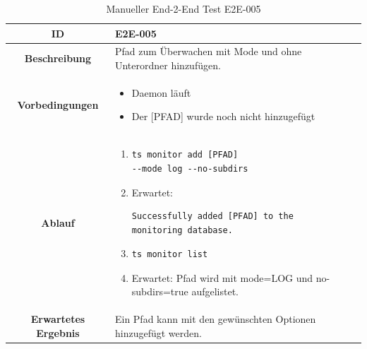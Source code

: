 \documentclass[a4paper,12pt]{report}
\begin{document}
    \clearpage

    \begin{table}[h!]
        \centering
        \setlength{\leftmargini}{0.8cm}
        \begin{tabular}{|c|p{10cm}|}
            \hline
            \textbf{ID}                  & E2E-005                                                        \\ \hline
            \textbf{Beschreibung}        & Pfad zum Überwachen mit Mode und ohne Unterordner hinzufügen.  \\ \hline
            \textbf{Vorbedingungen} &
            \begin{itemize}
                \item Daemon läuft
                \item  Der [PFAD] wurde noch nicht hinzugefügt
            \end{itemize} \\ \hline
            \textbf{Ablauf} &
            \begin{enumerate}
                \item \begin{verbatim}ts monitor add [PFAD]
--mode log --no-subdirs
                \end{verbatim}
                \item Erwartet: \begin{verbatim}Successfully added [PFAD] to the
monitoring database.
                \end{verbatim}
                \item \begin{verbatim}ts monitor list
                \end{verbatim}
                \item Erwartet: Pfad wird mit mode=LOG und no-subdirs=true aufgelistet.
            \end{enumerate} \\ \hline
            \textbf{Erwartetes Ergebnis} & Ein Pfad kann mit den gewünschten Optionen hinzugefügt werden. \\ \hline
        \end{tabular}
        \caption{Manueller End-2-End Test E2E-005}\label{tab:e2e-5}
    \end{table}
\end{document}
